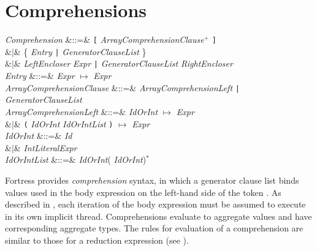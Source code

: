 %
%
%
%

\section{Comprehensions}


\begin{Grammar}
\emph{Comprehension}
&::=&
 \texttt{[} 
\emph{ArrayComprehensionClause}$^+$ \texttt{]}\\
&$|$&
 \{ 
\emph{Entry} \texttt{|} \emph{GeneratorClauseList} \} \\
&$|$&  \emph{LeftEncloser} 
\emph{Expr} \texttt{|} \emph{GeneratorClauseList} \emph{RightEncloser} \\

\emph{Entry} &::=& \emph{Expr} \ensuremath{\mapsto} \emph{Expr} \\

\emph{ArrayComprehensionClause} &::=&
\emph{ArrayComprehensionLeft} \texttt{|} \emph{GeneratorClauseList}\\

\emph{ArrayComprehensionLeft} &::=&
\emph{IdOrInt} \ensuremath{\mapsto} \emph{Expr}\\
&$|$& \texttt( \emph{IdOrInt}\EXP{,} \emph{IdOrIntList} \texttt) \ensuremath{\mapsto} \emph{Expr}\\

\emph{IdOrInt} &::=& \emph{Id}\\
&$|$& \emph{IntLiteralExpr}\\

\emph{IdOrIntList} &::=& \emph{IdOrInt}(\EXP{,} \emph{IdOrInt})$^*$ \\
\end{Grammar}

Fortress provides \emph{comprehension} syntax, in which a generator clause list
binds values used in the body expression on the left-hand side of the
token \EXP{|}.  As described in , each iteration of
the body expression must be assumed to execute in its own implicit
thread.  Comprehensions evaluate to aggregate values and have
corresponding aggregate types.  The rules for evaluation of a
comprehension are similar to those for a reduction expression (see
).

